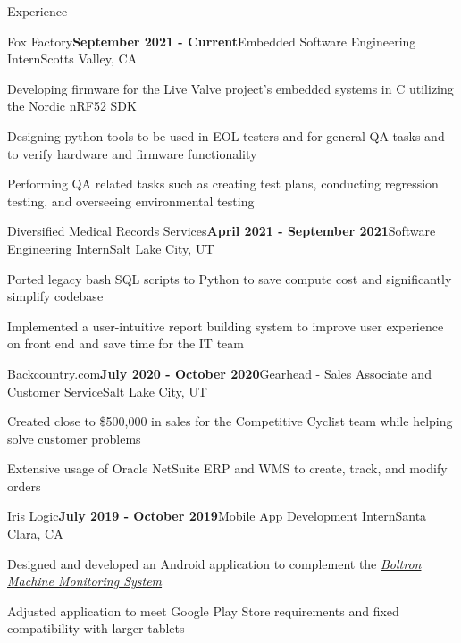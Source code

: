 \documentclass{resume}
\begin{document}
\begin{rSection}{\large Experience}

\begin{rSubsection}{Fox Factory}{\bf{September 2021 - Current}}{Embedded Software Engineering Intern}{Scotts Valley, CA }
\item Developing firmware for the Live Valve project's embedded systems in C utilizing the Nordic nRF52 SDK
\item Designing python tools to be used in EOL testers and for general QA tasks and to verify hardware and firmware functionality
\item Performing QA related tasks such as creating test plans, conducting regression testing, and overseeing environmental testing
\end{rSubsection}

\begin{rSubsection}{Diversified Medical Records Services}{\bf{April 2021 - September 2021}}{Software Engineering Intern}{Salt Lake City, UT }
\item Ported legacy bash SQL scripts to Python to save compute cost and significantly simplify codebase
\item Implemented a user-intuitive report building system to improve user experience on front end and save time for the IT team
\end{rSubsection}

\begin{rSubsection}{Backcountry.com}{\bf{July 2020 - October 2020}}{Gearhead - Sales Associate and Customer Service}{Salt Lake City, UT }
\item Created close to \$500,000 in sales for the Competitive Cyclist team while helping solve customer problems
\item Extensive usage of Oracle NetSuite ERP and WMS to create, track, and modify orders
\end{rSubsection}

\begin{rSubsection}{Iris Logic}{\bf{July 2019 - October 2019}}{Mobile App Development Intern}{Santa Clara, CA }
 \item Designed and developed an Android application to complement the \emph{\href{https://irislogic.com/boltron-machine-monitoring-system/}{Boltron Machine Monitoring System}}
\item Adjusted application to meet Google Play Store requirements and fixed compatibility with larger tablets
\end{rSubsection}

\end{rSection}
\end{document}
